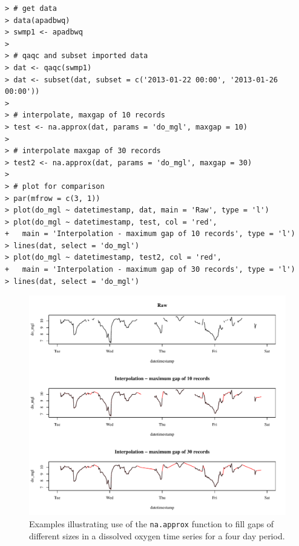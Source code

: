 \documentclass[10pt,letterpaper]{article}\usepackage[]{graphicx}\usepackage[]{color}
\makeatletter
\def\maxwidth{ %
  \ifdim\Gin@nat@width>\linewidth
    \linewidth
  \else
    \Gin@nat@width
  \fi
}
\newenvironment{kframe}{%
 \def\at@end@of@kframe{}%
 \ifinner\ifhmode%
  \def\at@end@of@kframe{\end{minipage}}%
  \begin{minipage}{\columnwidth}%
 \fi\fi%
 \def\FrameCommand##1{\hskip\@totalleftmargin \hskip-\fboxsep
 \colorbox{shadecolor}{##1}\hskip-\fboxsep
     \hskip-\linewidth \hskip-\@totalleftmargin \hskip\columnwidth}%
 \MakeFramed {\advance\hsize-\width
   \@totalleftmargin\z@ \linewidth\hsize
   \@setminipage}}%
 {\par\unskip\endMakeFramed%
 \at@end@of@kframe}
\newenvironment{knitrout}{}{} %
\makeatother
\begin{document}
\begin{knitrout}
\color{fgcolor}\begin{kframe}
\begin{verbatim}
> # get data
> data(apadbwq)
> swmp1 <- apadbwq
> 
> # qaqc and subset imported data
> dat <- qaqc(swmp1)
> dat <- subset(dat, subset = c('2013-01-22 00:00', '2013-01-26 00:00'))
> 
> # interpolate, maxgap of 10 records
> test <- na.approx(dat, params = 'do_mgl', maxgap = 10)
> 
> # interpolate maxgap of 30 records
> test2 <- na.approx(dat, params = 'do_mgl', maxgap = 30)
> 
> # plot for comparison
> par(mfrow = c(3, 1))
> plot(do_mgl ~ datetimestamp, dat, main = 'Raw', type = 'l')
> plot(do_mgl ~ datetimestamp, test, col = 'red', 
+   main = 'Interpolation - maximum gap of 10 records', type = 'l')
> lines(dat, select = 'do_mgl')
> plot(do_mgl ~ datetimestamp, test2, col = 'red', 
+   main = 'Interpolation - maximum gap of 30 records', type = 'l')
> lines(dat, select = 'do_mgl')
\end{verbatim}
\end{kframe}\begin{figure}[!ht]


{\centering \includegraphics[width=\maxwidth]{figure/interp_ex} 

}

\caption[Examples illustrating use of the \texttt{na.approx} function to fill gaps of different sizes in a dissolved oxygen time series for a four day period.]{Examples illustrating use of the \texttt{na.approx} function to fill gaps of different sizes in a dissolved oxygen time series for a four day period.\label{fig:interp_ex}}
\end{figure}


\end{knitrout}
\end{document}

